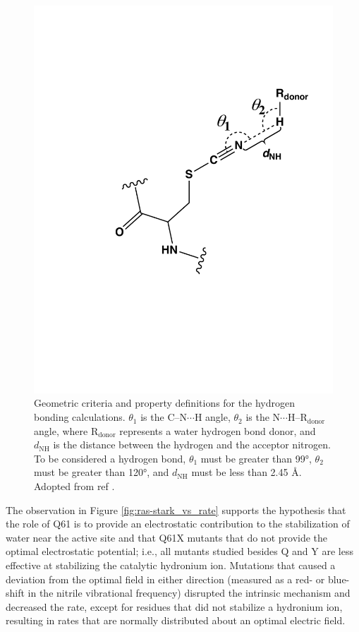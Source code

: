 \begin{figure}
    \center
    \includegraphics[width=\single]{figures-ras/Figure_S4.pdf}
    \caption[Geometric criteria for the hydrogen bonding calculations]{
        Geometric criteria and property definitions for the hydrogen bonding calculations. 
        $\theta_1$ is the C--N$\cdots$H angle, $\theta_2$ is the N$\cdots$H--R$_{\text{donor}}$ angle, where R$_{\text{donor}}$ represents a water hydrogen bond donor, and $d_{\text{NH}}$ is the distance between the hydrogen and the acceptor nitrogen. 
        To be considered a hydrogen bond, $\theta_1$ must be greater than \ang{99}, $\theta_2$ must be greater than \ang{120}, and $d_{\text{NH}}$ must be less than 2.45 \si{\angstrom}. 
        Adopted from ref .
    } 
    \label{fig:ras-hbond}
\end{figure}

The observation in Figure \ref{fig:ras-stark_vs_rate} supports the hypothesis that the role of Q61 is to provide an electrostatic contribution to the stabilization of water near the active site and that Q61X mutants that do not provide the optimal electrostatic potential; i.e., all mutants studied besides Q and Y are less effective at stabilizing the catalytic hydronium ion. 
Mutations that caused a deviation from the optimal field in either direction (measured as a red- or blue-shift in the nitrile vibrational frequency) disrupted the intrinsic mechanism and decreased the rate, except for residues that did not stabilize a hydronium ion, resulting in rates that are normally distributed about an optimal electric field.

